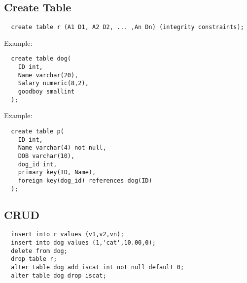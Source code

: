 \documentclass{math}
\begin{document}
\subsection*{Create Table}
\begin{lstlisting}
  create table r (A1 D1, A2 D2, ... ,An Dn) (integrity constraints);
\end{lstlisting}
Example:
\begin{lstlisting}
  create table dog(
    ID int,
    Name varchar(20),
    Salary numeric(8,2),
    goodboy smallint
  );
\end{lstlisting}
Example:
\begin{lstlisting}
  create table p(
    ID int,
    Name varchar(4) not null,
    DOB varchar(10),
    dog_id int,
    primary key(ID, Name),
    foreign key(dog_id) references dog(ID)
  );
\end{lstlisting}

\subsection*{CRUD}
\begin{lstlisting}
  insert into r values (v1,v2,vn);
  insert into dog values (1,'cat',10.00,0);
  delete from dog;
  drop table r;
  alter table dog add iscat int not null default 0;
  alter table dog drop iscat;
\end{lstlisting}
\end{document}
